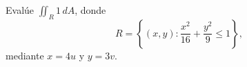 Evalúe $\iint_R 1\,dA$, donde
\[
R=\left\{(x,y):\frac{x^2}{16}+\frac{y^2}{9}\leq1\right\},
\]
mediante $x=4u$ y $y=3v$.

